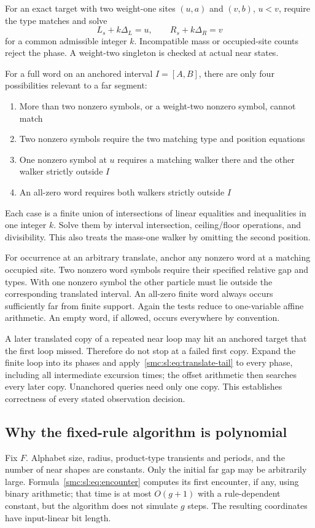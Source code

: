 \documentclass[11pt,letterpaper]{article}
\numberwithin{equation}{section}
\theoremstyle{definition}
\theoremstyle{remark}
\begin{document}
For an exact target with two weight-one sites $(u,a)$ and $(v,b)$, $u<v$, require the type matches and solve
\[
 L_s+k\Delta_L=u,\qquad R_s+k\Delta_R=v
\]
for a common admissible integer $k$. Incompatible mass or occupied-site counts reject the phase. A weight-two singleton is checked at actual near states.

For a full word on an anchored interval $I=[A,B]$, there are only four possibilities relevant to a far segment:
\begin{enumerate}
\item More than two nonzero symbols, or a weight-two nonzero symbol, cannot match
\item Two nonzero symbols require the two matching type and position equations
\item One nonzero symbol at $u$ requires a matching walker there and the other walker strictly outside $I$
\item An all-zero word requires both walkers strictly outside $I$
\end{enumerate}
Each case is a finite union of intersections of linear equalities and inequalities in one integer $k$. Solve them by interval intersection, ceiling/floor operations, and divisibility. This also treats the mass-one walker by omitting the second position.

For occurrence at an arbitrary translate, anchor any nonzero word at a matching occupied site. Two nonzero word symbols require their specified relative gap and types. With one nonzero symbol the other particle must lie outside the corresponding translated interval. An all-zero finite word always occurs sufficiently far from finite support. Again the tests reduce to one-variable affine arithmetic. An empty word, if allowed, occurs everywhere by convention.

A later translated copy of a repeated near loop may hit an anchored target that the first loop missed. Therefore do not stop at a failed first copy. Expand the finite loop into its phases and apply~\eqref{smc:sl:eq:translate-tail} to every phase, including all intermediate excursion times; the offset arithmetic then searches every later copy. Unanchored queries need only one copy. This establishes correctness of every stated observation decision.

\subsection{Why the fixed-rule algorithm is polynomial}
Fix $F$. Alphabet size, radius, product-type transients and periods, and the number of near shapes are constants. Only the initial far gap may be arbitrarily large. Formula~\eqref{smc:sl:eq:encounter} computes its first encounter, if any, using binary arithmetic; that time is at most $O(g+1)$ with a rule-dependent constant, but the algorithm does not simulate $g$ steps. The resulting coordinates have input-linear bit length.
\end{document}
